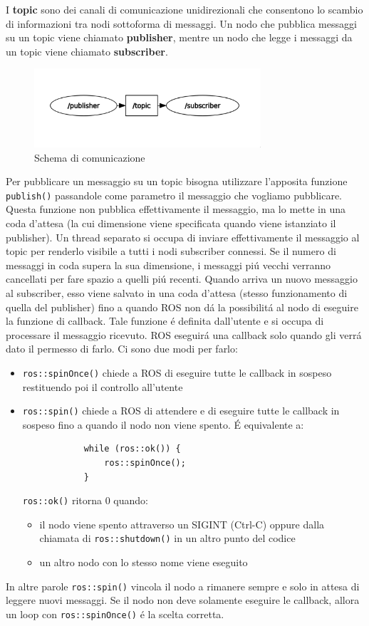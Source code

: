 I \textbf{topic} sono dei canali di comunicazione unidirezionali che consentono lo scambio di informazioni tra nodi sottoforma di 
messaggi. Un nodo che pubblica messaggi su un topic viene chiamato \textbf{publisher}, mentre un nodo che legge i messaggi da un topic 
viene chiamato \textbf{subscriber}.
\begin{figure}[H]
    \centering
    \includegraphics*[width=0.75\textwidth]{images/topic_graph.png}
    \caption{Schema di comunicazione}
    \label{fig:topic_graph}
\end{figure}
Per pubblicare un messaggio su un topic bisogna utilizzare l'apposita funzione \verb|publish()| passandole come parametro 
il messaggio che vogliamo pubblicare.
Questa funzione non pubblica effettivamente il messaggio, ma lo mette in una coda d'attesa (la cui 
dimensione viene specificata quando viene istanziato il publisher).
Un thread separato si occupa di inviare effettivamente il messaggio al topic per renderlo visibile a tutti i nodi subscriber 
connessi.
Se il numero di messaggi in coda supera la sua dimensione, i messaggi pi\'{u} vecchi verranno cancellati per fare spazio 
a quelli pi\'{u} recenti. Quando arriva un nuovo messaggio al subscriber, esso viene salvato 
in una coda d'attesa (stesso funzionamento di quella del publisher) fino a quando ROS non d\'{a} la possibilit\'{a} al nodo 
di eseguire la funzione di callback. Tale funzione \'{e} definita dall'utente e si occupa di processare il messaggio ricevuto. 
ROS eseguir\'{a} una callback solo quando gli verr\'{a} dato il permesso di farlo. Ci sono due modi per farlo:
\begin{itemize}
    \item \verb|ros::spinOnce()| chiede a ROS di eseguire tutte le callback in sospeso restituendo poi il controllo all'utente
    \item \verb|ros::spin()| chiede a ROS di attendere e di eseguire tutte le callback in sospeso fino a quando il nodo non 
          viene spento. \'{E} equivalente a:
          \begin{verbatim}
            while (ros::ok()) {
                ros::spinOnce();
            }
          \end{verbatim} 
          \verb|ros::ok()| ritorna 0 quando: 
          \begin{itemize}
            \item il nodo viene spento attraverso un SIGINT (Ctrl-C) oppure dalla chiamata di \verb|ros::shutdown()| in 
                  un altro punto del codice
            \item un altro nodo con lo stesso nome viene eseguito
          \end{itemize}
\end{itemize}
In altre parole \verb|ros::spin()| vincola il nodo a rimanere sempre e solo in attesa di leggere nuovi messaggi. 
Se il nodo non deve solamente eseguire le callback, allora un loop con \verb|ros::spinOnce()| \'{e} la scelta corretta. 
